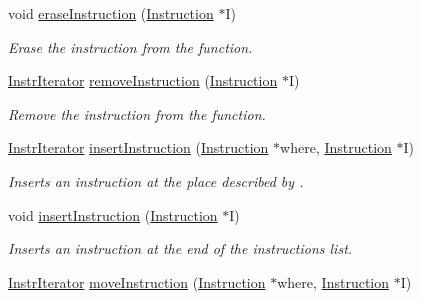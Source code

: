 \begin{DoxyCompactItemize}
\item 
\mbox{\label{classglow_1_1_i_r_function_a2169c4c753c9cc2472bcf504ede531bf}} 
void \hyperlink{classglow_1_1_i_r_function_a2169c4c753c9cc2472bcf504ede531bf}{erase\+Instruction} (\hyperlink{classglow_1_1_instruction}{Instruction} $\ast$I)
\begin{DoxyCompactList}\small\item\em Erase the instruction from the function. \end{DoxyCompactList}\item 
\mbox{\label{classglow_1_1_i_r_function_ab1c34e439de497a85d64e59fc0a9f19a}} 
\hyperlink{classglow_1_1tagged__list__details_1_1_iterator}{Instr\+Iterator} \hyperlink{classglow_1_1_i_r_function_ab1c34e439de497a85d64e59fc0a9f19a}{remove\+Instruction} (\hyperlink{classglow_1_1_instruction}{Instruction} $\ast$I)
\begin{DoxyCompactList}\small\item\em Remove the instruction from the function. \end{DoxyCompactList}\item 
\mbox{\label{classglow_1_1_i_r_function_a8178fc2d546721e9e05c8fd358fe2801}} 
\hyperlink{classglow_1_1tagged__list__details_1_1_iterator}{Instr\+Iterator} \hyperlink{classglow_1_1_i_r_function_a8178fc2d546721e9e05c8fd358fe2801}{insert\+Instruction} (\hyperlink{classglow_1_1_instruction}{Instruction} $\ast$where, \hyperlink{classglow_1_1_instruction}{Instruction} $\ast$I)
\begin{DoxyCompactList}\small\item\em Inserts an instruction at the place described by . \end{DoxyCompactList}\item 
\mbox{\label{classglow_1_1_i_r_function_ae4817c7b35cb5ee5d6791de1338d5d3e}} 
void \hyperlink{classglow_1_1_i_r_function_ae4817c7b35cb5ee5d6791de1338d5d3e}{insert\+Instruction} (\hyperlink{classglow_1_1_instruction}{Instruction} $\ast$I)
\begin{DoxyCompactList}\small\item\em Inserts an instruction at the end of the instructions list. \end{DoxyCompactList}\item 
\hyperlink{classglow_1_1tagged__list__details_1_1_iterator}{Instr\+Iterator} \hyperlink{classglow_1_1_i_r_function_a67e0ae4e7d97fba252dd6921a2cb4b74}{move\+Instruction} (\hyperlink{classglow_1_1_instruction}{Instruction} $\ast$where, \hyperlink{classglow_1_1_instruction}{Instruction} $\ast$I)
\end{DoxyCompactItemize}
